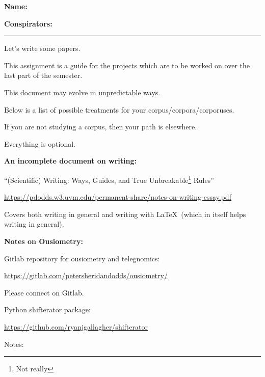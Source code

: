 \textbf{Name:} \\

\medskip

\textbf{Conspirators:} 

\medskip
\medskip

\hrule

\medskip





Let's write some papers.

This assignment is a guide for the projects which
are to be worked on over the last part of the semester.

This document may evolve in unpredictable ways.

Below is a list of possible treatments for your corpus/corpora/corporuses.

If you are not studying a corpus, then your path is elsewhere.

Everything is optional.


\clearpage


\textbf{An incomplete document on writing:}

``(Scientific) Writing: Ways, Guides, and True Unbreakable\footnote{Not really} Rules''

\url{https://pdodds.w3.uvm.edu/permanent-share/notes-on-writing-essay.pdf}

Covers both writing in general and writing with \LaTeX\ (which in itself helps writing in general).

\textbf{Notes on Ousiometry:}

Gitlab repository for ousiometry and telegnomics:

\url{https://gitlab.com/petersheridandodds/ousiometry/}

Please connect on Gitlab.

Python shifterator package:

\url{https://github.com/ryanjgallagher/shifterator}

Notes:

